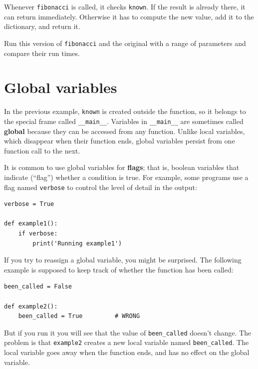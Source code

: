 \documentclass[10pt]{book}
\begin{document}
Whenever {\tt fibonacci} is called, it checks {\tt known}.
If the result is already there, it can return
immediately.  Otherwise it has to 
compute the new value, add it to the dictionary, and return it.

\begin{ex}
Run this version of {\tt fibonacci} and the original with
a range of parameters and compare their run times.
\end{ex}


\section{Global variables}


In the previous example, {\tt known} is created outside the function,
so it belongs to the special frame called \verb"__main__".
Variables in \verb"__main__" are sometimes called {\bf global}
because they can be accessed from any function.  Unlike local
variables, which disappear when their function ends, global variables
persist from one function call to the next.


It is common to use global variables for {\bf flags}; that is, 
boolean variables that indicate (``flag'') whether a condition
is true.  For example, some programs use
a flag named {\tt verbose} to control the level of detail in the
output:

\beforeverb
\begin{verbatim}
verbose = True

def example1():
    if verbose:
        print('Running example1')
\end{verbatim}
\afterverb
%
If you try to reassign a global variable, you might be surprised.
The following example is supposed to keep track of whether the
function has been called:


\beforeverb
\begin{verbatim}
been_called = False

def example2():
    been_called = True         # WRONG
\end{verbatim}
\afterverb
%
But if you run it you will see that the value of \verb"been_called"
doesn't change.  The problem is that {\tt example2} creates a new local
variable named \verb"been_called".  The local variable goes away when
the function ends, and has no effect on the global variable.
\end{document}
